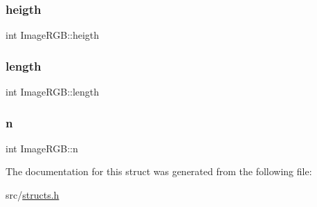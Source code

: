 \subsubsection{\texorpdfstring{heigth}{heigth}}
{\footnotesize\ttfamily int Image\+R\+G\+B\+::heigth}

\mbox{\label{structImageRGB_aade093b3345da900be6b0b572e1a2ff3}} 
\subsubsection{\texorpdfstring{length}{length}}
{\footnotesize\ttfamily int Image\+R\+G\+B\+::length}

\mbox{\label{structImageRGB_a2f1abb0dcc200c479eff40638e30da79}} 
\subsubsection{\texorpdfstring{n}{n}}
{\footnotesize\ttfamily int Image\+R\+G\+B\+::n}



The documentation for this struct was generated from the following file\+:\begin{DoxyCompactItemize}
\item 
src/\hyperlink{structs_8h}{structs.\+h}\end{DoxyCompactItemize}
